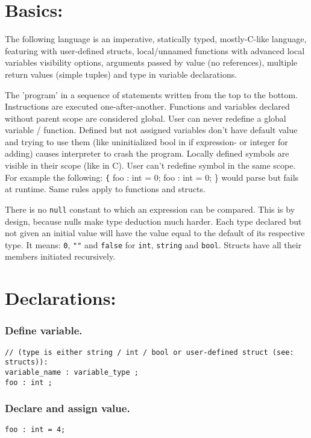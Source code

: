 \documentclass[11pt]{article}
\begin{document}
\section*{Basics:}
\label{sec:org09fac9d}
The following language is an imperative, statically typed, mostly-C-like
language, featuring with user-defined structs, local/unnamed functions with
advanced local variables visibility options, arguments passed by value (no
references), multiple return values (simple tuples) and type in variable
declarations.

The 'program' in a sequence of statements written from the top to the bottom.
Instructions are executed one-after-another.  Functions and variables declared
without parent scope are considered global.  User can never redefine a global
variable / function. Defined but not assigned variables don't have default
value and trying to use them (like uninitialized bool in if expression- or
integer for adding) causes interpreter to crash the program. Locally defined
symbols are visible in their scope (like in C). User can't redefine symbol in
the same scope. For example the following: \texttt\{ foo : int = 0; foo : int =
0; \} would parse but fails at runtime. Same rules apply to functions and
structs.

There is no \texttt{null} constant to which an expression can be
compared. This is by design, because nulls make type deduction much
harder. Each type declared but not given an initial value will have the value
equal to the default of its respective type. It means: \texttt{0}, \texttt{""}
and \texttt{false} for \texttt{int}, \texttt{string} and
\texttt{bool}. Structs have all their members initiated recursively.

\section*{Declarations:}
\label{sec:orgf258dea}

\subsubsection*{Define variable.}
\label{sec:orga468156}
\begin{verbatim}
// (type is either string / int / bool or user-defined struct (see: structs)):
variable_name : variable_type ;
foo : int ;
\end{verbatim}

\subsubsection*{Declare and assign value.}
\label{sec:org801f62f}
\begin{verbatim}
foo : int = 4;
\end{verbatim}
\end{document}
